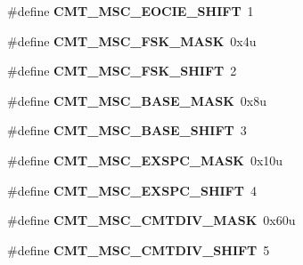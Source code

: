 \begin{DoxyCompactItemize}
\item 
\#define {\bfseries C\+M\+T\+\_\+\+M\+S\+C\+\_\+\+E\+O\+C\+I\+E\+\_\+\+S\+H\+I\+FT}~1\hypertarget{group__CMT__Register__Masks_gaa7fa1a5e01690a63a09459cca5b763d0}{}\label{group__CMT__Register__Masks_gaa7fa1a5e01690a63a09459cca5b763d0}

\item 
\#define {\bfseries C\+M\+T\+\_\+\+M\+S\+C\+\_\+\+F\+S\+K\+\_\+\+M\+A\+SK}~0x4u\hypertarget{group__CMT__Register__Masks_gae434ad9168835c6d9e4d941a90a568cb}{}\label{group__CMT__Register__Masks_gae434ad9168835c6d9e4d941a90a568cb}

\item 
\#define {\bfseries C\+M\+T\+\_\+\+M\+S\+C\+\_\+\+F\+S\+K\+\_\+\+S\+H\+I\+FT}~2\hypertarget{group__CMT__Register__Masks_ga73422722bbae07a50d0b2b473f5f9417}{}\label{group__CMT__Register__Masks_ga73422722bbae07a50d0b2b473f5f9417}

\item 
\#define {\bfseries C\+M\+T\+\_\+\+M\+S\+C\+\_\+\+B\+A\+S\+E\+\_\+\+M\+A\+SK}~0x8u\hypertarget{group__CMT__Register__Masks_gac099af54e9456cad9c3343184d3e041a}{}\label{group__CMT__Register__Masks_gac099af54e9456cad9c3343184d3e041a}

\item 
\#define {\bfseries C\+M\+T\+\_\+\+M\+S\+C\+\_\+\+B\+A\+S\+E\+\_\+\+S\+H\+I\+FT}~3\hypertarget{group__CMT__Register__Masks_ga3ddb10ae744a6e2149a0d0185a796571}{}\label{group__CMT__Register__Masks_ga3ddb10ae744a6e2149a0d0185a796571}

\item 
\#define {\bfseries C\+M\+T\+\_\+\+M\+S\+C\+\_\+\+E\+X\+S\+P\+C\+\_\+\+M\+A\+SK}~0x10u\hypertarget{group__CMT__Register__Masks_gafeb71169b6c47237583101487f6412e1}{}\label{group__CMT__Register__Masks_gafeb71169b6c47237583101487f6412e1}

\item 
\#define {\bfseries C\+M\+T\+\_\+\+M\+S\+C\+\_\+\+E\+X\+S\+P\+C\+\_\+\+S\+H\+I\+FT}~4\hypertarget{group__CMT__Register__Masks_ga7a71704451408ca7e8c8802fa72d4e4d}{}\label{group__CMT__Register__Masks_ga7a71704451408ca7e8c8802fa72d4e4d}

\item 
\#define {\bfseries C\+M\+T\+\_\+\+M\+S\+C\+\_\+\+C\+M\+T\+D\+I\+V\+\_\+\+M\+A\+SK}~0x60u\hypertarget{group__CMT__Register__Masks_gab663f14909462192c6e432c7bd0e56bf}{}\label{group__CMT__Register__Masks_gab663f14909462192c6e432c7bd0e56bf}

\item 
\#define {\bfseries C\+M\+T\+\_\+\+M\+S\+C\+\_\+\+C\+M\+T\+D\+I\+V\+\_\+\+S\+H\+I\+FT}~5\hypertarget{group__CMT__Register__Masks_gad2d262cf3ba8ccd189bd321219579c52}{}\label{group__CMT__Register__Masks_gad2d262cf3ba8ccd189bd321219579c52}


\end{DoxyCompactItemize}
